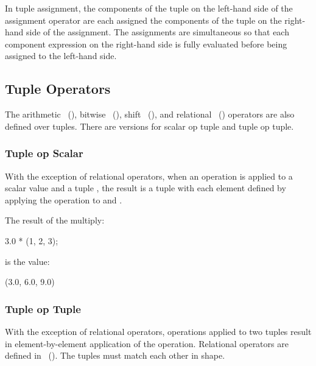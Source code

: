 In tuple assignment, the components of the tuple on the left-hand
side of the assignment operator are each assigned the components of
the tuple on the right-hand side of the assignment.  The assignments
are simultaneous so that each component expression on the right-hand
side is fully evaluated before being assigned to the left-hand side.

\subsection{Tuple Operators}
\label{Tuple_Operators}

The arithmetic ~(), bitwise
~(), shift ~(), and
relational ~() operators are also defined
over tuples.  There are versions for scalar op tuple and tuple op tuple.

\subsubsection{Tuple op Scalar}
\label{Tuple_Scalar_Operators}
With the exception of relational operators, when an operation is applied
to a scalar value  and a tuple , the result is a tuple
 with each element  defined by applying the operation
to  and .

\begin{example}
The result of the multiply:
\begin{chapel}
3.0 * (1, 2, 3);
\end{chapel}
is the value:
\begin{chapel}
(3.0, 6.0, 9.0)
\end{chapel}
\end{example}

\subsubsection{Tuple op Tuple}
\label{Tuple_Tuple_Operations}
With the exception of relational operators, operations applied to two
tuples result in element-by-element application of the operation.
Relational operators are defined in ~().
The tuples must match each other in shape.


